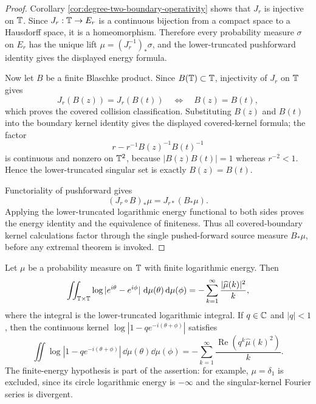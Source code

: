 \begin{proof}
Corollary \ref{cor:degree-two-boundary-operativity} shows that \(J_r\) is injective on \(\mathbb{T}\).  Since \(J_r:\mathbb{T}\to E_r\) is a continuous bijection from a compact space to a Hausdorff space, it is a homeomorphism.  Therefore every probability measure \(\sigma\) on \(E_r\) has the unique lift \(\mu=(J_r^{-1})_\ast\sigma\), and the lower-truncated pushforward identity gives the displayed energy formula.

Now let \(B\) be a finite Blaschke product.  Since \(B(\mathbb{T})\subset\mathbb{T}\), injectivity of \(J_r\) on \(\mathbb{T}\) gives
\[
J_r(B(z))=J_r(B(t))
\quad\Longleftrightarrow\quad
B(z)=B(t),
\]
which proves the covered collision classification.  Substituting \(B(z)\) and \(B(t)\) into the boundary kernel identity gives the displayed covered-kernel formula; the factor
\[
r-r^{-1}B(z)^{-1}B(t)^{-1}
\]
is continuous and nonzero on \(\mathbb{T}^2\), because \(|B(z)B(t)|=1\) whereas \(r^{-2}<1\).  Hence the lower-truncated singular set is exactly \(B(z)=B(t)\).

Functoriality of pushforward gives
\[
(J_r\circ B)_\ast\mu=J_{r\ast}(B_\ast\mu).
\]
Applying the lower-truncated logarithmic energy functional to both sides proves the energy identity and the equivalence of finiteness.  Thus all covered-boundary kernel calculations factor through the single pushed-forward source measure \(B_\ast\mu\), before any extremal theorem is invoked.
\end{proof}

\begin{lemma}\label{lem:circle-log-kernel-fourier-truncation}
Let \(\mu\) be a probability measure on \(\mathbb{T}\) with finite logarithmic energy.  Then
\[
\iint_{\mathbb{T}\times\mathbb{T}}\log|e^{i\theta}-e^{i\phi}|\,\,\mathrm{d}\mu(\theta)\,\mathrm{d}\mu(\phi)
=-
\sum_{k=1}^{\infty}\frac{|\widehat\mu(k)|^2}{k},
\]
where the integral is the lower-truncated logarithmic integral.  If
\(q\in\mathbb{C}\) and \(|q|<1\), then the continuous kernel
\(\log|1-qe^{-i(\theta+\phi)}|\) satisfies
\[
\iint\log|1-qe^{-i(\theta+\phi)}|\,\dd\mu(\theta)\dd\mu(\phi)
=-
\sum_{k=1}^{\infty}\frac{\operatorname{Re}(q^k\widehat\mu(k)^2)}{k}.
\]
The finite-energy hypothesis is part of the assertion: for example,
\(\mu=\delta_1\) is excluded, since its circle logarithmic energy is
\(-\infty\) and the singular-kernel Fourier series is divergent.
\end{lemma}

